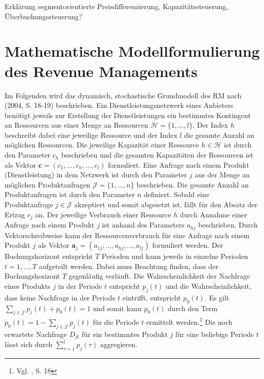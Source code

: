 Erklärung segmentorientierte Preisdifferenzierung, Kapazitätssteuerung, Überbuchungssteuerung?

\section{Mathematische Modellformulierung des Revenue Managements}\label{Grundmodell}
Im Folgenden wird das dynamisch, stochastische Grundmodell des RM nach \citeauthor{talluri2004revenue} (2004, S. 18-19) beschrieben. Ein Dienstleistungsnetzwerk eines Anbieters benötigt jeweils zur Erstellung der Dienstleistungen ein bestimmtes Kontingent an Ressourcen aus einer Menge an Ressourcen $\mathcal{H} = \{1,...,l \}$. Der Index $h$ beschreibt dabei eine jeweilige Ressource und der Index $l$ die gesamte Anzahl an möglichen Ressourcen. Die jeweilige Kapazität einer Ressource $h \in \mathcal{H}$ ist durch den Parameter $c_{h}$ beschrieben und die gesamten Kapazitäten der Ressourcen ist als Vektor $\textbf{c}=(c_{1},...,c_{h},...,c_{l})$ formuliert. Eine Anfrage nach einem Produkt (Dienstleistung) in dem Netzwerk ist durch den Parameter $j$ aus der Menge an möglichen Produktanfragen $\mathcal{J} = \{1,...,n \}$ %
beschrieben. Die gesamte Anzahl an Produktanfragen ist durch den Parameter $n$ definiert. Sobald eine Produktanfrage $j\in \mathcal{J}$ akzeptiert und somit abgesetzt ist, fällt für den Absatz der Ertrag $r_{j}$ an. Der jeweilige Verbrauch einer Ressource $h$ durch Annahme einer Anfrage nach einem Produkt $j$ ist anhand des Parameters $a_{hj}$ beschrieben. Durch Vektorschreibweise kann der Ressourcenverbrauch für eine Anfrage nach einem Produkt $j$ als Vektor $\textbf{a}_{j}=(a_{1j},...,a_{hj},...,a_{lj})$ formuliert werden. Der Buchungshorizont entspricht $T$ Perioden und kann jeweils in einzelne Perioden $t=1,...,T$ aufgeteilt werden. Dabei muss Beachtung finden, dass der Buchungshorizont $T$ gegenläufig verläuft. Die Wahrscheinlichkeit der Nachfrage eines Produkts $j$ in der Periode $t$ entspricht $p_{j}(t)$ und die Wahrscheinlichkeit, dass keine Nachfrage in der Periode $t$ eintrifft, entspricht $p_{0}(t)$. Es gilt $\sum_{j\in \mathcal{J}}p_{j}(t)+p_{0}(t)=1$ und somit kann $p_{0}(t)$ durch den Term $p_{0}(t)=1-\sum_{j\in \mathcal{J}}p_{j}(t)$ für die Periode $t$ ermittelt werden.\footnote{Vgl. \citeauthor{talluri2004revenue}, S. 18} Die noch erwartete Nachfrage $D_{jt}$ für ein bestimmtes Produkt $j$ für eine beliebige Periode $t$ lässt sich durch $\sum_{\tau=1}^{t}p_{j}(\tau)$ aggregieren. 


